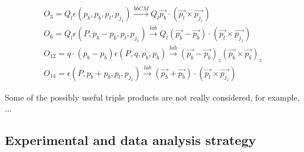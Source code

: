 	\begin{equation}
	\begin{split}
	O_3 = Q_l \epsilon(p_{b}, p_{\bar{b}}, p_{l}, p_{j_1}) \xrightarrow[\text{}]{b \bar{b} CM} Q_l \vec{p_{b}} \cdot ( \vec{p_l} \times \vec{p_{j_1}} ) \\
	O_{6} = Q_l \epsilon(P, p_{b}-p_{\bar{b}}, p_{l}, p_{j_1}) \xrightarrow[\text{}]{lab} Q_l (\vec{p_{b}} - \vec{p_{\overline{b}}}) \cdot ( \vec{p_l} \times \vec{p_{j_1}} ) \\
	O_{12} = q \cdot (p_{b}-p_{\bar{b}}) \epsilon(P_{}, q, p_{b}, p_{\bar{b}}) \xrightarrow[]{lab} (\vec{p_{b}} - \vec{p_{\overline{b}}})_z ( \vec{p_b} \times \vec{p_{\overline{b}}} )_z \\
	O_{14} = \epsilon(P, p_{b}+p_{\bar{b}}, p_{l}, p_{j_1}) \xrightarrow[]{lab} (\vec{p_{b}} + \vec{p_{\overline{b}}}) \cdot ( \vec{p_l} \times \vec{p_{j_1}} )
	\end{split}
	\label{eq:four_obs}
	\end{equation}

	Some of the possibly useful triple products are not really considered, for example, ... %


	\subsection{Experimental and data analysis strategy}
	\label{ssec:Intro_ExpDAStr}

\FloatBarrier
